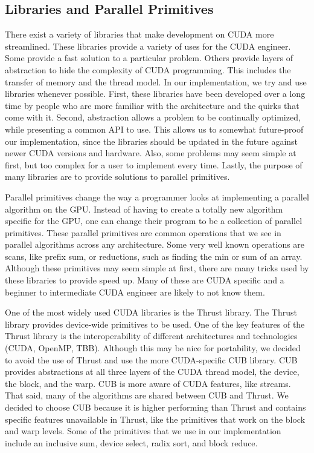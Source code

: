 \subsection{Libraries and Parallel Primitives}
\label{sec:primitives}

There exist a variety of libraries that make development on CUDA more streamlined.
These libraries provide a variety of uses for the CUDA engineer.
Some provide a fast solution to a particular problem.
Others provide layers of abstraction to hide the complexity of CUDA programming.
This includes the transfer of memory and the thread model.
In our implementation, we try and use libraries whenever possible.
First, these libraries have been developed over a long time by people who are more familiar with the architecture and the quirks that come with it.
Second, abstraction allows a problem to be continually optimized, while presenting a common API to use.
This allows us to somewhat future-proof our implementation, since the libraries should be updated in the future against newer CUDA versions and hardware.
Also, some problems may seem simple at first, but too complex for a user to implement every time.
Lastly, the purpose of many libraries are to provide solutions to parallel primitives.

Parallel primitives change the way a programmer looks at implementing a parallel algorithm on the GPU.
Instead of having to create a totally new algorithm specific for the GPU, one can change their program to be a collection of parallel primitives.
These parallel primitives are common operations that we see in parallel algorithms across any architecture.
Some very well known operations are scans, like prefix sum, or reductions, such as finding the min or sum of an array.
Although these primitives may seem simple at first, there are many tricks used by these libraries to provide speed up.
Many of these are CUDA specific and a beginner to intermediate CUDA engineer are likely to not know them.

One of the most widely used CUDA libraries is the Thrust library.
The Thrust library provides device-wide primitives to be used.
One of the key features of the Thrust library is the interoperability of different architectures and technologies (CUDA, OpenMP, TBB).
Although this may be nice for portability, we decided to avoid the use of Thrust and use the more CUDA-specific CUB library.
CUB provides abstractions at all three layers of the CUDA thread model, the device, the block, and the warp.
CUB is more aware of CUDA features, like streams.
That said, many of the algorithms are shared between CUB and Thrust.
We decided to choose CUB because it is higher performing than Thrust and contains specific features unavailable in Thrust, like the primitives that work on the block and warp levels.
Some of the primitives that we use in our implementation include an inclusive sum, device select, radix sort, and block reduce.

